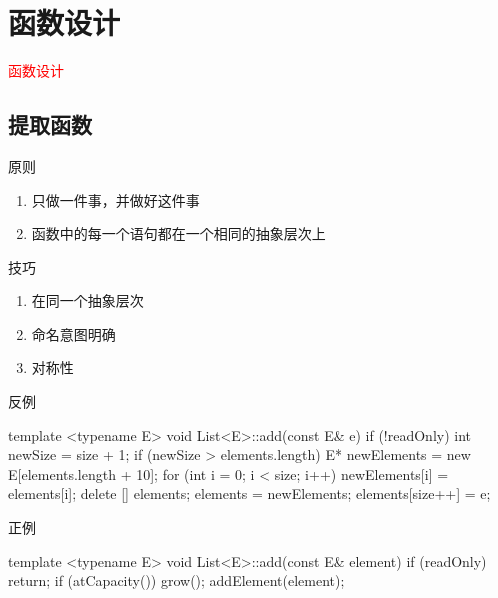 \section{函数设计}
\label{sec:function}

\begin{frame}
  \begin{center}
    \Huge{\textcolor{red}{函数设计}}
  \end{center}
\end{frame}

\subsection{提取函数}

\begin{frame}[fragile]{原则}
\begin{enumerate}
  \item 只做一件事，并做好这件事
  \item 函数中的每一个语句都在一个相同的抽象层次上
\end{enumerate}
\end{frame}

\begin{frame}[fragile]{技巧}
\begin{enumerate}
  \item 在同一个抽象层次
  \item 命名意图明确
  \item 对称性
\end{enumerate}
\end{frame}

\begin{frame}[fragile]{反例}
  \begin{c++}
template <typename E>
void List<E>::add(const E& e) {
  if (!readOnly) {
    int newSize = size + 1;
    if (newSize > elements.length) {
      E* newElements = new E[elements.length + 10];
      for (int i = 0; i < size; i++) {
        newElements[i] = elements[i];
        delete [] elements;
      }
      elements = newElements;
    }
    elements[size++] = e;
  }
}
  \end{c++}
\end{frame}

\begin{frame}[fragile]{正例}
  \begin{c++}
template <typename E>
void List<E>::add(const E& element) {
  if (readOnly) 
    return;
  if (atCapacity()) 
    grow();
  addElement(element);
}
  \end{c++}
\end{frame}

